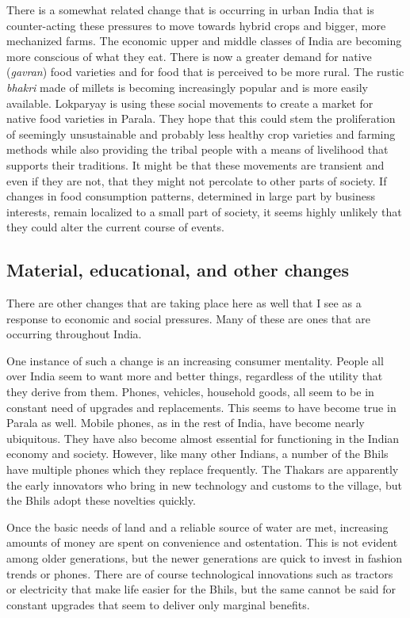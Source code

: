 \documentclass[report.tex]{subfiles}
\begin{document}
There is a somewhat related change that is occurring in urban India that is counter-acting these pressures to move towards hybrid crops and bigger, more mechanized farms. The economic upper and middle classes of India are becoming more conscious of what they eat. There is now a greater demand for native (\textit{gavran}) food varieties and for food that is perceived to be more rural. The rustic \textit{bhakri} made of millets is becoming increasingly popular and is more easily available. Lokparyay is using these social movements to create a market for native food varieties in Parala. They hope that this could stem the proliferation of seemingly unsustainable and probably less healthy crop varieties and farming methods while also providing the tribal people with a means of livelihood that supports their traditions. It might be that these movements are transient and even if they are not, that they might not percolate to other parts of society. If changes in food consumption patterns, determined in large part by business interests, remain localized to a small part of society, it seems highly unlikely that they could alter the current course of events.

\newpage

\subsection{Material, educational, and other changes}

There are other changes that are taking place here as well that I see as a response to economic and social pressures. Many of these are ones that are occurring throughout India.

One instance of such a change is an increasing consumer mentality. People all over India seem to want more and better things, regardless of the utility that they derive from them. Phones, vehicles, household goods, all seem to be in constant need of upgrades and replacements. This seems to have become true in Parala as well. Mobile phones, as in the rest of India, have become nearly ubiquitous. They have also become almost essential for functioning in the Indian economy and society. However, like many other Indians, a number of the Bhils have multiple phones which they replace frequently. The Thakars are apparently the early innovators who bring in new technology and customs to the village, but the Bhils adopt these novelties quickly.

Once the basic needs of land and a reliable source of water are met, increasing amounts of money are spent on convenience and ostentation. This is not evident among older generations, but the newer generations are quick to invest in fashion trends or phones. There are of course technological innovations such as tractors or electricity that make life easier for the Bhils, but the same cannot be said for constant upgrades that seem to deliver only marginal benefits.
\end{document}
